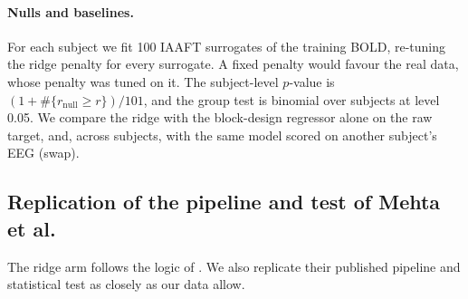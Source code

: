 \paragraph{Nulls and baselines.} For each subject we fit 100 IAAFT surrogates \citep{schreiber1996improved} of the training BOLD, re-tuning the ridge penalty for every surrogate. A fixed penalty would favour the real data, whose penalty was tuned on it. The subject-level $p$-value is $(1+\#\{r_{\mathrm{null}}\ge r\})/101$, and the group test is binomial over subjects at level 0.05. We compare the ridge with the block-design regressor alone on the raw target, and, across subjects, with the same model scored on another subject's EEG (swap).

\subsection{Replication of the pipeline and test of Mehta et al.}\label{sec:mehta}\label{supp:mehta}
The ridge arm follows the logic of \citet{mehta2025eegbold}. We also replicate their published pipeline and statistical test as closely as our data allow.
